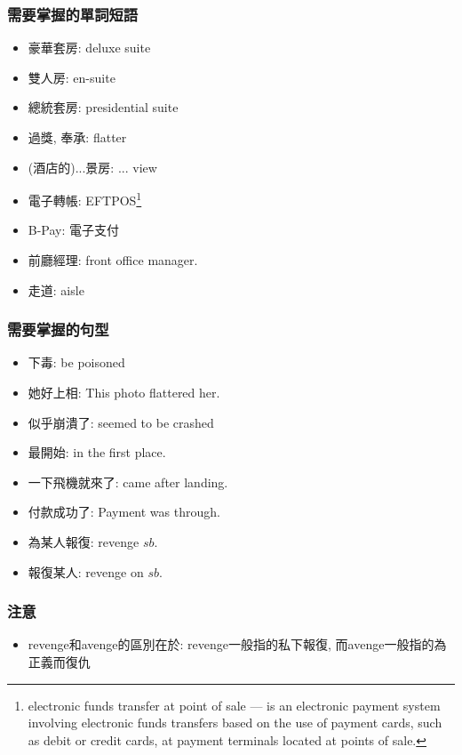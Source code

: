 \subsubsection*{需要掌握的單詞短語}
\begin{multicols}{2}
\begin{itemize}
  \itemsep0em
  \item 豪華套房: deluxe suite
  \item 雙人房: en-suite
  \item 總統套房: presidential suite
  \item 過獎, 奉承: flatter
  \item (酒店的)...景房: ... view
  \item 電子轉帳: EFTPOS\footnote{electronic funds transfer at point of sale — is an electronic payment system involving electronic funds transfers based on the use of payment cards, such as debit or credit cards, at payment terminals located at points of sale.}
  \item B-Pay: 電子支付
  \item 前廳經理: front office manager.
  \item 走道: aisle
\end{itemize}
\end{multicols}

\subsubsection*{需要掌握的句型}
\begin{multicols}{2}
\begin{itemize}
  \itemsep0em
  \item 下毒: be poisoned
  \item 她好上相: This photo flattered her.
  \item 似乎崩潰了: seemed to be crashed
  \item 最開始: in the first place.
  \item 一下飛機就來了: came  after landing.
  \item 付款成功了: Payment was through.
  \item 為某人報復: revenge $sb.$
  \item 報復某人: revenge on $sb.$
\end{itemize}
\end{multicols}

\subsubsection*{注意}
\begin{itemize}
  \itemsep0em
  \item revenge和avenge的區別在於: revenge一般指的私下報復, 而avenge一般指的為正義而復仇
\end{itemize}

